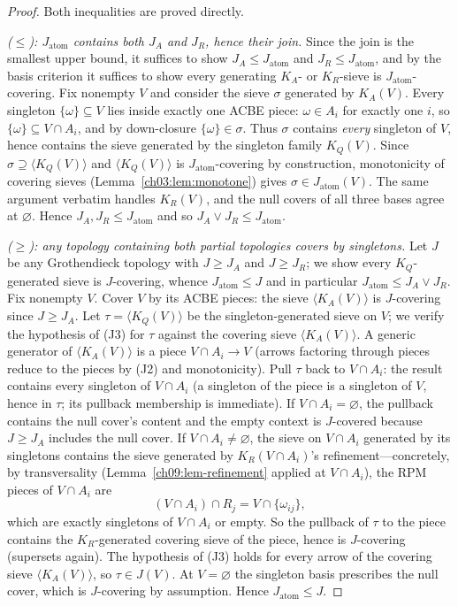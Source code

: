 \begin{proof}
Both inequalities are proved directly.

\emph{($\le$): $J_{\mathrm{atom}}$ contains both $J_{A}$ and $J_{R}$, hence their join.} Since the join is the smallest upper bound, it suffices to show $J_{A}\le J_{\mathrm{atom}}$ and $J_{R}\le J_{\mathrm{atom}}$, and by the basis criterion it suffices to show every generating $K_{A}$- or $K_{R}$-sieve is $J_{\mathrm{atom}}$-covering. Fix nonempty $V$ and consider the sieve $\sigma$ generated by $K_{A}(V)$. Every singleton $\{\omega\}\subseteq V$ lies inside exactly one ACBE piece: $\omega\in A_{i}$ for exactly one $i$, so $\{\omega\}\subseteq V\cap A_{i}$, and by down-closure $\{\omega\}\in\sigma$. Thus $\sigma$ contains \emph{every} singleton of $V$, hence contains the sieve generated by the singleton family $K_{Q}(V)$. Since $\sigma\supseteq\langle K_{Q}(V)\rangle$ and $\langle K_{Q}(V)\rangle$ is $J_{\mathrm{atom}}$-covering by construction, monotonicity of covering sieves (Lemma~\ref{ch03:lem:monotone}) gives $\sigma\in J_{\mathrm{atom}}(V)$. The same argument verbatim handles $K_{R}(V)$, and the null covers of all three bases agree at $\varnothing$. Hence $J_{A},J_{R}\le J_{\mathrm{atom}}$ and so $J_{A}\vee J_{R}\le J_{\mathrm{atom}}$.

\emph{($\ge$): any topology containing both partial topologies covers by singletons.} Let $J$ be any Grothendieck topology with $J\ge J_{A}$ and $J\ge J_{R}$; we show every $K_{Q}$-generated sieve is $J$-covering, whence $J_{\mathrm{atom}}\le J$ and in particular $J_{\mathrm{atom}}\le J_{A}\vee J_{R}$. Fix nonempty $V$. Cover $V$ by its ACBE pieces: the sieve $\langle K_{A}(V)\rangle$ is $J$-covering since $J\ge J_{A}$. Let $\tau=\langle K_{Q}(V)\rangle$ be the singleton-generated sieve on $V$; we verify the hypothesis of (J3) for $\tau$ against the covering sieve $\langle K_{A}(V)\rangle$. A generic generator of $\langle K_{A}(V)\rangle$ is a piece $V\cap A_{i}\to V$ (arrows factoring through pieces reduce to the pieces by (J2) and monotonicity). Pull $\tau$ back to $V\cap A_{i}$: the result contains every singleton of $V\cap A_{i}$ (a singleton of the piece is a singleton of $V$, hence in $\tau$; its pullback membership is immediate). If $V\cap A_{i}=\varnothing$, the pullback contains the null cover's content and the empty context is $J$-covered because $J\ge J_{A}$ includes the null cover. If $V\cap A_{i}\neq\varnothing$, the sieve on $V\cap A_{i}$ generated by its singletons contains the sieve generated by $K_{R}(V\cap A_{i})$'s refinement---concretely, by transversality (Lemma~\ref{ch09:lem-refinement} applied at $V\cap A_{i}$), the RPM pieces of $V\cap A_{i}$ are
\[
(V\cap A_{i})\cap R_{j}=V\cap\{\omega_{ij}\},
\]
which are exactly singletons of $V\cap A_{i}$ or empty. So the pullback of $\tau$ to the piece contains the $K_{R}$-generated covering sieve of the piece, hence is $J$-covering (supersets again). The hypothesis of (J3) holds for every arrow of the covering sieve $\langle K_{A}(V)\rangle$, so $\tau\in J(V)$. At $V=\varnothing$ the singleton basis prescribes the null cover, which is $J$-covering by assumption. Hence $J_{\mathrm{atom}}\le J$.


\end{proof}

